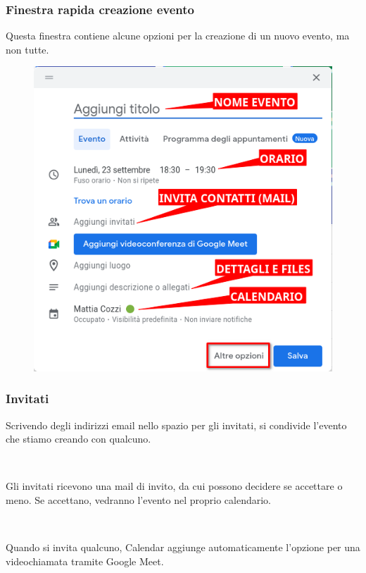 \documentclass[handout]{beamer}
\begin{document}
\begin{frame}
\frametitle{Finestra rapida creazione evento}
Questa finestra contiene alcune opzioni per la creazione di un nuovo evento, ma non tutte.

\begin{figure}
  \includegraphics[width=.5\columnwidth]{img/calendarcrea2.png}
\end{figure}
\end{frame}

\begin{frame}
\frametitle{Invitati}
Scrivendo degli indirizzi email nello spazio per gli invitati, si condivide l'evento che stiamo creando con qualcuno.

~

Gli invitati ricevono una mail di invito, da cui possono decidere se accettare o meno. Se accettano, vedranno l'evento nel proprio calendario.

~

Quando si invita qualcuno, Calendar aggiunge automaticamente l'opzione per una videochiamata tramite Google Meet.
\end{frame}
\end{document}
